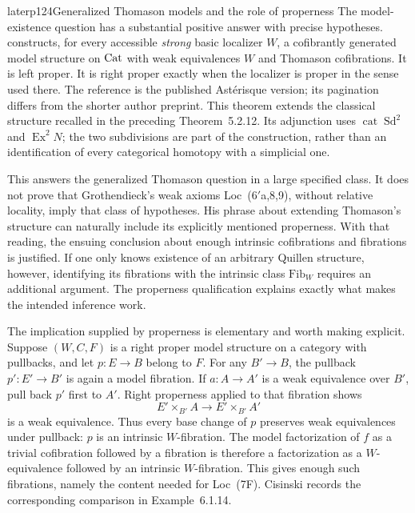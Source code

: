 \begin{dcomment}{later}{p124}{Generalized Thomason models and the role of properness}
The model-existence question has a substantial positive answer with precise hypotheses. \citet[Theorem~5.2.15, p.~225]{Cisinski2006} constructs, for every accessible \emph{strong} basic localizer $W$, a cofibrantly generated model structure on $\mathrm{Cat}$ with weak equivalences $W$ and Thomason cofibrations. It is left proper. It is right proper exactly when the localizer is proper in the sense used there. The reference is the published Ast\'erisque version; its pagination differs from the shorter author preprint. This theorem extends the classical structure recalled in the preceding Theorem~5.2.12. Its adjunction uses $\operatorname{cat}\operatorname{Sd}^2$ and $\operatorname{Ex}^2N$; the two subdivisions are part of the construction, rather than an identification of every categorical homotopy with a simplicial one.

This answers the generalized Thomason question in a large specified class. It does not prove that Grothendieck's weak axioms Loc~(6$'$a,8,9), without relative locality, imply that class of hypotheses. His phrase about extending Thomason's structure can naturally include its explicitly mentioned properness. With that reading, the ensuing conclusion about enough intrinsic cofibrations and fibrations is justified. If one only knows existence of an arbitrary Quillen structure, however, identifying its fibrations with the intrinsic class $\mathrm{Fib}_W$ requires an additional argument. The properness qualification explains exactly what makes the intended inference work.

The implication supplied by properness is elementary and worth making explicit. Suppose $(W,C,F)$ is a right proper model structure on a category with pullbacks, and let $p:E\to B$ belong to $F$. For any $B'\to B$, the pullback $p':E'\to B'$ is again a model fibration. If $a:A\to A'$ is a weak equivalence over $B'$, pull back $p'$ first to $A'$. Right properness applied to that fibration shows
\[
 E'\times_{B'}A\longrightarrow E'\times_{B'}A'
\]
is a weak equivalence. Thus every base change of $p$ preserves weak equivalences under pullback: $p$ is an intrinsic $W$-fibration. The model factorization of $f$ as a trivial cofibration followed by a fibration is therefore a factorization as a $W$-equivalence followed by an intrinsic $W$-fibration. This gives enough such fibrations, namely the content needed for Loc~(7F). Cisinski records the corresponding comparison in Example~6.1.14.


\end{dcomment}
